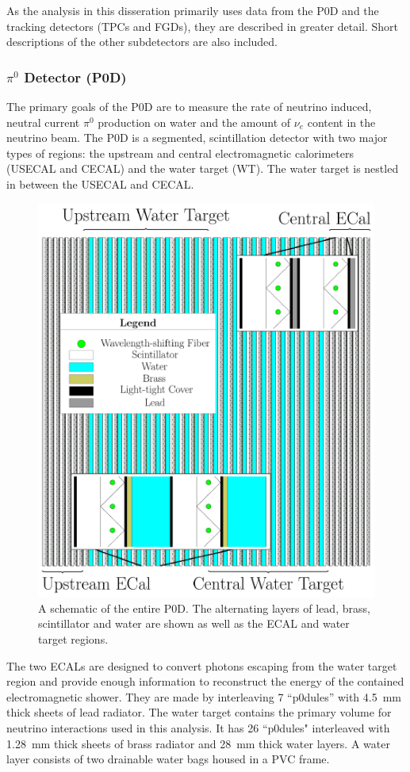 As the analysis in this disseration primarily uses data from the P0D
and the tracking detectors (TPCs and FGDs), they are described in
greater detail. Short descriptions of the other subdetectors are also included.

\subsubsection{$\pi^0$ Detector (P0D)}

The primary goals of the P0D are to measure the rate of neutrino
induced, neutral current $\pi^0$ production on water and the amount of
$\nu_e$ content in the neutrino beam. The P0D is a segmented, scintillation detector with two
major types of regions: the upstream and central electromagnetic
calorimeters (USECAL and CECAL) and the water
target (WT). The water target is nestled in between the USECAL and
CECAL. 

\begin{figure}
\begin{center}
\includegraphics[width=.7\textwidth]{./Figures/p0d1.png}
\end{center}
\caption{A schematic of the entire P0D. The alternating layers of
  lead, brass, scintillator and water are shown as well as the ECAL
  and water target regions.}
\label{fig:p0d}
\end{figure}

The two ECALs are designed to convert photons escaping from the water
target region and provide enough information to reconstruct the energy
of the contained electromagnetic shower. They are made by interleaving
7 ``p0dules'' with 4.5~mm thick sheets of lead radiator. The water
target contains the primary volume for neutrino interactions used in
this analysis. It has 26 ``p0dules" interleaved with 1.28~mm thick
sheets of brass radiator and 28~mm thick water layers. A water layer
consists of two drainable water bags housed in a PVC frame. 

